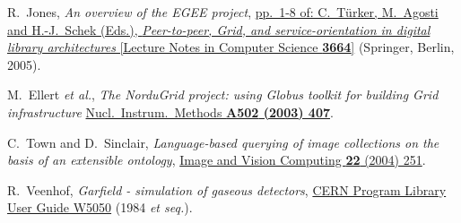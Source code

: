 \documentclass{elsart}
\def\etal {\textit{et al.}}
\begin{document}
\begin{thebibliography}{00}
 R.~Jones,
\textit{An overview of the EGEE project},
\href{http://dx.doi.org/10.1007/11549819}
{pp.~1-8 of: C.~T\"urker, M.~Agosti and H.-J.~Schek (Eds.),
\textit{Peer-to-peer, Grid, and service-orientation in digital library
architectures}
[Lecture Notes in Computer Science \textbf{3664}]} (Springer, Berlin, 2005).

 M.~Ellert \etal,
\textit{The NorduGrid project: using Globus toolkit for building Grid
infrastructure}
\href{http://dx.doi.org/10.1016/S0168-9002(03)00453-4}
{Nucl.\ Instrum.\ Methods \bf{A502} (2003) 407}.



 C.~Town and D.~Sinclair,
\textit{Language-based querying of image collections on the basis of an
extensible ontology},
\href{http://dx.doi.org/10.1016/j.imavis.2003.10.002}
{Image and Vision Computing \textbf{22} (2004) 251}.

 R.~Veenhof,
\textit{Garfield - simulation of gaseous detectors},
\href{http://consult.cern.ch/writeup/garfield/}
{CERN Program Library User Guide W5050} (1984 \textit{et seq.}).


\end{thebibliography}
\end{document}
